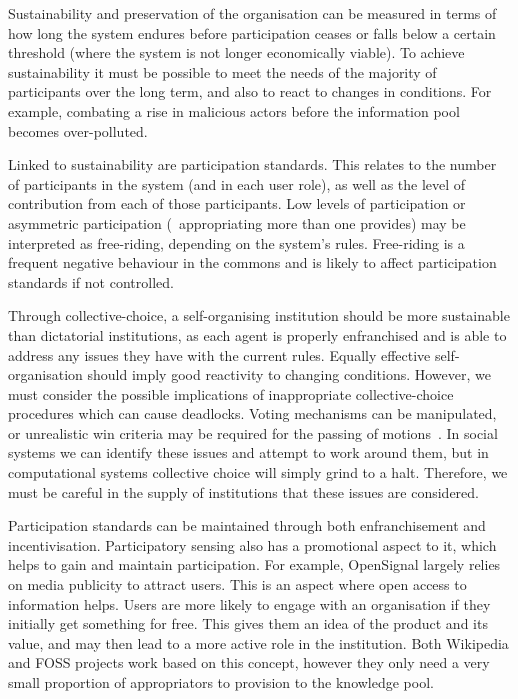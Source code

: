 Sustainability and preservation of the organisation can be measured in terms of how long the system endures before participation ceases or falls below a certain threshold (where the system is not longer economically viable). 
To achieve sustainability it must be possible to meet the needs of the majority of participants over the long term, and also to react to changes in conditions. 
For example, combating a rise in malicious actors before the information pool becomes over-polluted. 

Linked to sustainability are participation standards. 
This relates to the number of participants in the system (and in each user role), as well as the level of contribution from each of those participants. Low levels of participation or asymmetric participation (\eg\ appropriating more than one provides) may be interpreted as free-riding, depending on the system's rules. 
Free-riding is a frequent negative behaviour in the commons and is likely to affect participation standards if not controlled.

Through collective-choice, a self-organising institution should be more sustainable than dictatorial institutions, as each agent is properly enfranchised and is able to address any issues they have with the current rules. 
Equally effective self-organisation should imply good reactivity to changing conditions. 
However, we must consider the possible implications of inappropriate collective-choice procedures which can cause deadlocks. 
Voting mechanisms can be manipulated, or unrealistic win criteria may be required for the passing of motions~\citep{Pitt2011b}. 
In social systems we can identify these issues and attempt to work around them, but in computational systems collective choice will simply grind to a halt. 
Therefore, we must be careful in the supply of institutions that these issues are considered.

Participation standards can be maintained through both enfranchisement and incentivisation. 
Participatory sensing also has a promotional aspect to it, which helps to gain and maintain participation. 
For example, OpenSignal largely relies on media publicity to attract users. 
This is an aspect where open access to information helps. 
Users are more likely to engage with an organisation if they initially get something for free. 
This gives them an idea of the product and its value, and may then lead to a more active role in the institution. 
Both Wikipedia and \ac{FOSS} projects work based on this concept, however they only need a very small proportion of appropriators to provision to the knowledge pool. 

